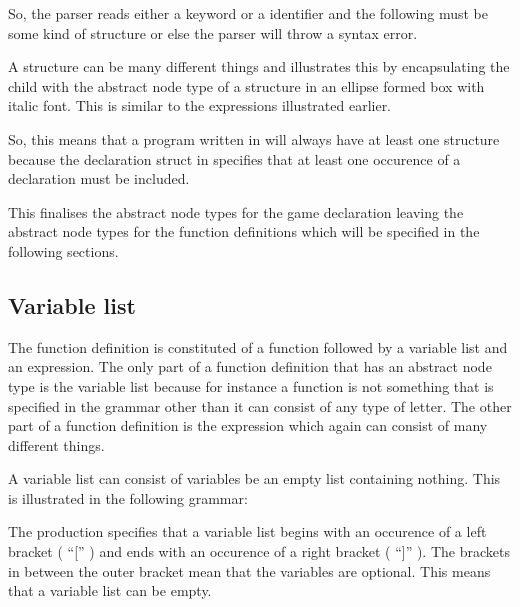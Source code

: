 \begin{ebnf}%
%
\end{ebnf}%

So, the parser reads either a keyword or a identifier and the following must be some kind of structure or else the parser will throw a syntax error.%

A structure can be many different things and  illustrates this by encapsulating the child with the abstract node type of a structure in an ellipse formed box with italic font. This is similar to the expressions illustrated earlier.%

%

So, this means that a program written in \productname{} will always have at least one structure because the declaration struct in  specifies that at least one occurence of a declaration must be included.%

This finalises the abstract node types for the game declaration leaving the abstract node types for the function definitions which will be specified in the following sections.%

\subsection{Variable list}%

The function definition is constituted of a function followed by a variable list and an expression. The only part of a function definition that has an abstract node type is the variable list because for instance a function is not something that is specified in the grammar other than it can consist of any type of letter. The other part of a function definition is the expression which again can consist of many different things.%

A variable list can consist of variables be an empty list containing nothing. This is illustrated in the following grammar:%

\begin{ebnf}%
%
\end{ebnf}%

The production specifies that a variable list begins with an occurence of a left bracket ( ``['' ) and ends with an occurence of a right bracket ( ``]'' ). The brackets in between the outer bracket mean that the variables are optional. This means that a variable list can be empty.%

